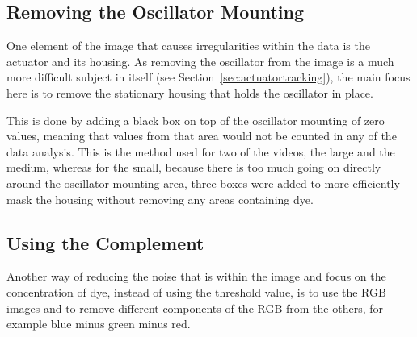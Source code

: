 \subsection{Removing the Oscillator Mounting}
\label{sec:oscillatormountingremoval}

One element of the image that causes irregularities within the data is the actuator and its housing. As removing the oscillator from the image is a much more difficult subject in itself (see Section~\ref{sec:actuatortracking}), the main focus here is to remove the stationary housing that holds the oscillator in place. 
\newline

This is done by adding a black box on top of the oscillator mounting of zero values, meaning that values from that area would not be counted in any of the data analysis. This is the method used for two of the videos, the large and the medium, whereas for the small, because there is too much going on directly around the oscillator mounting area, three boxes were added to more efficiently mask the housing without removing any areas containing dye.

\subsection{Using the Complement}



Another way of reducing the noise that is within the image and focus on the concentration of dye, instead of using the threshold value, is to use the RGB images and to remove different components of the RGB from the others, for example blue minus green minus red.

